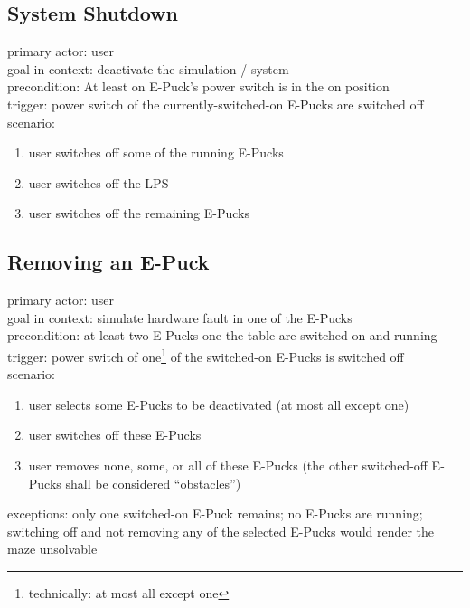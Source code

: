 \documentclass[a4paper,parskip,headheight=38pt]{scrartcl} %
\begin{document}
\subsection{System Shutdown}
primary actor: user \\
goal in context: deactivate the simulation / system \\
precondition: At least on E-Puck's power switch is in the on position \\
trigger: power switch of the currently-switched-on E-Pucks are switched off \\
scenario: 
\begin{enumerate}[label={\arabic*.}]
	\item user switches off some of the running E-Pucks 
	\item user switches off the LPS 
	\item user switches off the remaining E-Pucks 
\end{enumerate}

\subsection{Removing an E-Puck}
primary actor: user \\
goal in context: simulate hardware fault in one of the E-Pucks \\
precondition: at least two E-Pucks one the table are switched on and running \\
trigger: power switch of one\footnote{technically: at most all except one} of the switched-on E-Pucks is switched off \\
scenario: 
\begin{enumerate}[label={\arabic*.}]
	\item user selects some E-Pucks to be deactivated (at most all except one) 
	\item user switches off these E-Pucks 
	\item user removes none, some, or all of these E-Pucks (the other switched-off E-Pucks shall be considered \enquote{obstacles}) 
\end{enumerate}
exceptions: only one switched-on E-Puck remains; no E-Pucks are running; switching off and not removing any of the selected E-Pucks would render the maze unsolvable \\
\end{document}
